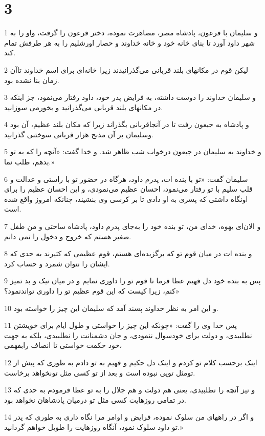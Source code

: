 \chapter{3}

\par 1 و سلیمان با فرعون، پادشاه مصر، مصاهرت نموده، دختر فرعون را گرفت، واو را به شهر داود آورد تا بنای خانه خود و خانه خداوند و حصار اورشلیم را به هر طرفش تمام کند.
\par 2 لیکن قوم در مکانهای بلند قربانی می‌گذرانیدند زیرا خانه‌ای برای اسم خداوند تاآن زمان بنا نشده بود.
\par 3 و سلیمان خداوند را دوست داشته، به فرایض پدر خود، داود رفتار می‌نمود، جز اینکه در مکانهای بلند قربانی می‌گذرانید و بخورمی سوزانید.
\par 4 و پادشاه به جبعون رفت تا در آنجاقربانی بگذراند زیرا که مکان بلند عظیم، آن بود وسلیمان بر آن مذبح هزار قربانی سوختنی گذرانید.
\par 5 و خداوند به سلیمان در جبعون درخواب شب ظاهر شد. و خدا گفت: «آنچه را که به تو بدهم، طلب نما.»
\par 6 سلیمان گفت: «تو با بنده ات، پدرم داود، هرگاه در حضور تو با راستی و عدالت و قلب سلیم با تو رفتار می‌نمود، احسان عظیم می‌نمودی، و این احسان عظیم را برای اونگاه داشتی که پسری به او دادی تا بر کرسی وی بنشیند، چنانکه امروز واقع شده است.
\par 7 و الان‌ای یهوه، خدای من، تو بنده خود را به‌جای پدرم داود، پادشاه ساختی و من طفل صغیر هستم که خروج و دخول را نمی دانم.
\par 8 و بنده ات در میان قوم تو که برگزیده‌ای هستم، قوم عظیمی که کثیرند به حدی که ایشان را نتوان شمرد و حساب کرد.
\par 9 پس به بنده خود دل فهیم عطا فرما تا قوم تو را داوری نمایم و در میان نیک و بد تمیز کنم، زیرا کیست که این قوم عظیم تو را داوری تواندنمود؟»
\par 10 و این امر به نظر خداوند پسند آمد که سلیمان این چیز را خواسته بود.
\par 11 پس خدا وی را گفت: «چونکه این چیز را خواستی و طول ایام برای خویشتن نطلبیدی، و دولت برای خودسوال ننمودی، و جان دشمنانت را نطلبیدی، بلکه به جهت خود حکمت خواستی تا انصاف رابفهمی،
\par 12 اینک بر‌حسب کلام تو کردم و اینک دل حکیم و فهیم به تو دادم به طوری که پیش از تومثل تویی نبوده است و بعد از تو کسی مثل تونخواهد برخاست.
\par 13 و نیز آنچه را نطلبیدی، یعنی هم دولت و هم جلال را به تو عطا فرمودم به حدی که در تمامی روزهایت کسی مثل تو درمیان پادشاهان نخواهد بود.
\par 14 و اگر در راههای من سلوک نموده، فرایض و اوامر مرا نگاه داری به طوری که پدر تو داود سلوک نمود، آنگاه روزهایت را طویل خواهم گردانید.»

